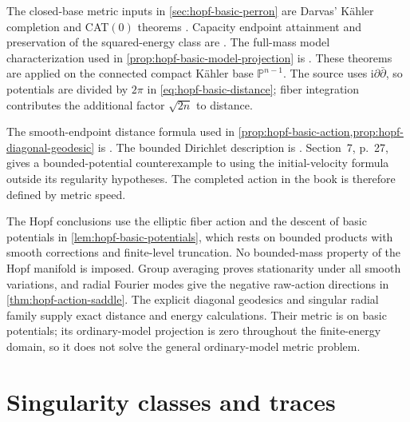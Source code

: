 The closed-base metric inputs in \cref{sec:hopf-basic-perron} are Darvas' K\"ahler completion and CAT$(0)$ theorems \cite[v3, Theorems~6.1 and~9.2, pp.~20--26 and~30--32]{DarvasCompletion17}. Capacity endpoint attainment and preservation of the squared-energy class are \cite[v3, Theorem~5.2 and Corollary~5.4, pp.~18--20]{DarvasCompletion17}. The full-mass model characterization used in \cref{prop:hopf-basic-model-projection} is \cite[v3, Theorem~4.3, pp.~16--17]{DarvasCompletion17}. These theorems are applied on the connected compact K\"ahler base $\mathbb P^{n-1}$. The source uses $\mathrm i\partial\bar\partial$, so potentials are divided by $2\pi$ in \eqref{eq:hopf-basic-distance}; fiber integration contributes the additional factor $\sqrt{2n}$ to distance.

The smooth-endpoint distance formula used in \cref{prop:hopf-basic-action,prop:hopf-diagonal-geodesic} is \cite[v3, equation~(15), p.~8, and Theorem~7.2, p.~28]{DarvasCompletion17}. The bounded Dirichlet description is \cite[v3, Section~2.2, equations~(16)--(17), p.~9]{DarvasCompletion17}. Section~7, p.~27, gives a bounded-potential counterexample to using the initial-velocity formula outside its regularity hypotheses. The completed action in the book is therefore defined by metric speed.

The Hopf conclusions use the elliptic fiber action and the descent of basic potentials in \cref{lem:hopf-basic-potentials}, which rests on bounded products with smooth corrections and finite-level truncation. No bounded-mass property of the Hopf manifold is imposed. Group averaging proves stationarity under all smooth variations, and radial Fourier modes give the negative raw-action directions in \cref{thm:hopf-action-saddle}. The explicit diagonal geodesics and singular radial family supply exact distance and energy calculations. Their metric is on basic potentials; its ordinary-model projection is zero throughout the finite-energy domain, so it does not solve the general ordinary-model metric problem.

\section{Singularity classes and traces}
\label{sec:history-singularities}

